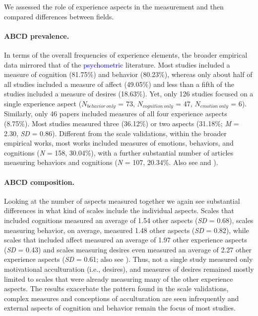 We assessed the role of experience aspects in the measurement and then
compared differences between fields.

\paragraph{ABCD prevalence.}

In terms of the overall frequencies of experience elements, the broader
empirical data mirrored that of the \textcolor{blue}{psychometric}
literature. Most studies included a measure of cognition (81.75\%) and
behavior (80.23\%), whereas only about half of all studies included a
measure of affect (49.05\%) and less than a fifth of the studies
included a measure of desires (18.63\%). Yet, only 126 studies focused
on a single experience aspect (\(N_{behavior\ only}\) = 73,
\(N_{cognition\ only}\) = 47, \(N_{emotion\ only}\) = 6). Similarly,
only 46 papers included measures of all four experience aspects
(8.75\%). Most studies measured three (36.12\%) or two aspects (31.18\%;
\textit{M} = 2.30, \textit{SD} = 0.86). Different from the scale
validations, within the broader empirical works, most works included
measures of emotions, behaviors, and cognitions (\textit{N} = 158,
30.04\%), with a further substantial number of articles measuring
behaviors and cognitions (\textit{N} = 107, 20.34\%. Also see
 and ).

\paragraph{ABCD composition.}

Looking at the number of aspects measured together we again see
substantial differences in what kind of scales include the individual
aspects. Scales that included cognitions measured an average of 1.54
other aspects (\textit{SD} = 0.68), scales measuring behavior, on
average, measured 1.48 other aspects (\textit{SD} = 0.82), while scales
that included affect measured an average of 1.97 other experience
aspects (\textit{SD} = 0.43) and scales measuring desires even measured
an average of 2.27 other experience aspects (\textit{SD} = 0.61; also
see ). Thus, not a single study
measured only motivational acculturation (i.e., desires), and measures
of desires remained mostly limited to scales that were already measuring
many of the other experience aspects. The results exacerbate the pattern
found in the scale validations, complex measures and conceptions of
acculturation are seen infrequently and external aspects of cognition
and behavior remain the focus of most studies.

